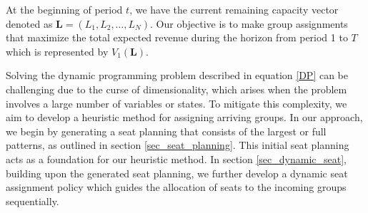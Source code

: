 At the beginning of period $t$, we have the current remaining capacity vector denoted as $\mathbf{L} = (L_1, L_2, \ldots, L_N)$. Our objective is to make group assignments that maximize the total expected revenue during the horizon from period 1 to $T$ which is represented by $V_1(\mathbf{L})$.

Solving the dynamic programming problem described in equation \eqref{DP} can be challenging due to the curse of dimensionality, which arises when the problem involves a large number of variables or states. To mitigate this complexity, we aim to develop a heuristic method for assigning arriving groups. In our approach, we begin by generating a seat planning that consists of the largest or full patterns, as outlined in section \ref{sec_seat_planning}. This initial seat planning acts as a foundation for our heuristic method. In section \ref{sec_dynamic_seat}, building upon the generated seat planning, we further develop a dynamic seat assignment policy which guides the allocation of seats to the incoming groups sequentially. 










